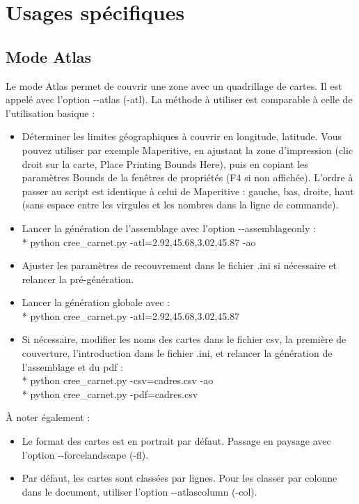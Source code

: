 \documentclass[12pt,french]{article}
\begin{document}
\section{Usages spécifiques}
\subsection{Mode Atlas}
Le mode Atlas permet de couvrir une zone avec un quadrillage de cartes. Il est appelé avec l'option -\mbox{}-atlas (-atl). La méthode à utiliser est comparable à celle de l'utilisation basique : 
\begin{itemize}
\item Déterminer les limites géographiques à couvrir en longitude, latitude. Vous pouvez utiliser par exemple Maperitive, en ajustant la zone d'impression (clic droit sur la carte, Place Printing Bounds Here), puis en copiant les paramètres Bounds de la fenêtres de propriétés (F4 si non affichée). L'ordre à passer au script est identique à celui de Maperitive : gauche, bas, droite, haut (sans espace entre les virgules et les nombres dans la ligne de commande).
\item Lancer la génération de l'assemblage avec l'option -\mbox{}-assemblageonly :\\*
python cree\_carnet.py -atl=2.92,45.68,3.02,45.87 -ao
\item Ajuster les paramètres de recouvrement dans le fichier .ini si nécessaire et relancer la pré-génération.
\item Lancer la génération globale avec :\\*
python cree\_carnet.py -atl=2.92,45.68,3.02,45.87
\item Si nécessaire, modifier les noms des cartes dans le fichier csv, la première de couverture, l'introduction dans le fichier .ini, et relancer la génération de l'assemblage et du pdf :\\*
python cree\_carnet.py -csv=cadres.csv -ao\\*
python cree\_carnet.py -pdf=cadres.csv
\end{itemize} 
À noter également :
\begin{itemize}
\item Le format des cartes est en portrait par défaut. Passage en paysage avec l'option -\mbox{}-forcelandscape (-fl).
\item Par défaut, les cartes sont classées par lignes. Pour les classer par colonne dans le document, utiliser l'option -\mbox{}-atlascolumn (-col).
\end{itemize}\par 
\end{document}
